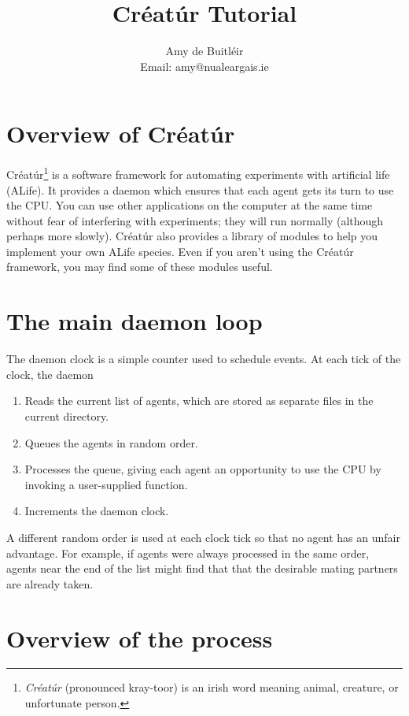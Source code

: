 \documentclass[a4paper,10pt]{report}
\title{Créatúr Tutorial}
\author{Amy de Buitl\'eir\\
        Email: amy@nualeargais.ie}
\begin{document}
\maketitle

\tableofcontents

\section{Overview of Créatúr}

Créatúr\footnote{\emph{Créatúr} (pronounced kray-toor) is an irish word 
meaning animal, creature, or unfortunate person.} 
is a software framework for automating experiments
with artificial life (ALife). 
It provides a daemon which ensures that each agent gets its turn 
to use the CPU. 
You can use other applications on the computer at the same time
without fear of interfering with experiments; they
will run normally (although perhaps more slowly).
Créatúr also provides a library of modules to help you implement your own 
ALife species.
Even if you aren't using the Créatúr framework, you may find some of these
modules useful.

\section{The main daemon loop}
\label{sec:daemon}

The daemon clock is a simple counter used to schedule events.
At each tick of the clock, the daemon

\begin{enumerate}
\item Reads the current list of agents, which are stored as separate files in
the current directory.
\item Queues the agents in random order.
\item Processes the queue, giving each agent an opportunity
to use the CPU by invoking a user-supplied function.
\item Increments the daemon clock.
\end {enumerate}

A different random order is used at each clock tick
so that no agent has an unfair advantage.
For example, if agents were always processed in the same order, 
agents near the end of the list might find that that the desirable mating
partners are already taken.

\section{Overview of the process}
\end{document}
